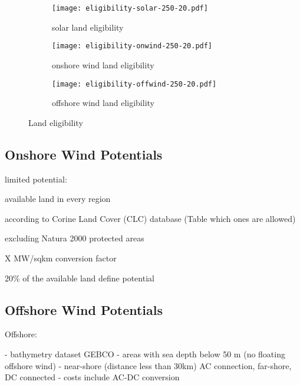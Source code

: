 \begin{landscape}

\begin{figure}
    \centering
    \begin{subfigure}[t]{0.5\textwidth}
            \centering
        \caption{solar land eligibility}
        \texttt{[image: eligibility-solar-250-20.pdf]}
    \end{subfigure}
    \begin{subfigure}[t]{0.5\textwidth}
        \centering
        \caption{onshore wind land eligibility}
        \texttt{[image: eligibility-onwind-250-20.pdf]}
    \end{subfigure}
    \begin{subfigure}[t]{0.5\textwidth}
        \centering
        \caption{offshore wind land eligibility}
        \texttt{[image: eligibility-offwind-250-20.pdf]}
    \end{subfigure}
    \caption{Land eligibility}
    \label{fig:eligibility}
\end{figure}


\end{landscape}
\restoregeometry

\subsection{Onshore Wind Potentials}

limited potential:

available land in every region

according to Corine Land Cover (CLC) database (Table which ones are allowed)

excluding Natura 2000 protected areas



X MW/sqkm conversion factor

20\% of the available land define potential

\cite{mckennaHighresolutionLargescale2022,Ryberg2018}

\subsection{Offshore Wind Potentials}

Offshore:

- bathymetry dataset GEBCO
- areas with sea depth below 50 m (no floating offshore wind)
- near-shore (distance less than 30km) AC connection, far-shore, DC connected
- costs include AC-DC conversion

